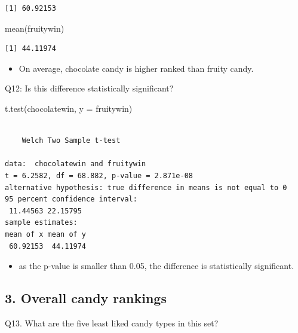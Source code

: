 \documentclass[
  letterpaper,
  DIV=11,
  numbers=noendperiod]{scrartcl}
\newenvironment{Shaded}{\begin{snugshade}}{\end{snugshade}}
\newcommand{\AttributeTok}[1]{\textcolor[rgb]{0.40,0.45,0.13}{#1}}
\newcommand{\DecValTok}[1]{\textcolor[rgb]{0.68,0.00,0.00}{#1}}
\newcommand{\FunctionTok}[1]{\textcolor[rgb]{0.28,0.35,0.67}{#1}}
\newcommand{\NormalTok}[1]{\textcolor[rgb]{0.00,0.23,0.31}{#1}}
\newcommand{\SpecialCharTok}[1]{\textcolor[rgb]{0.37,0.37,0.37}{#1}}
\providecommand{\tightlist}{%
  \setlength{\itemsep}{0pt}\setlength{\parskip}{0pt}}\usepackage{longtable,booktabs,array}
\begin{document}
\begin{verbatim}
[1] 60.92153
\end{verbatim}

\begin{Shaded}
\begin{Highlighting}[]
\FunctionTok{mean}\NormalTok{(fruitywin)}
\end{Highlighting}
\end{Shaded}

\begin{verbatim}
[1] 44.11974
\end{verbatim}

\begin{itemize}
\tightlist
\item
  On average, chocolate candy is higher ranked than fruity candy.
\end{itemize}

Q12: Is this difference statistically significant?

\begin{Shaded}
\begin{Highlighting}[]
\FunctionTok{t.test}\NormalTok{(chocolatewin, }\AttributeTok{y =}\NormalTok{ fruitywin)}
\end{Highlighting}
\end{Shaded}

\begin{verbatim}

    Welch Two Sample t-test

data:  chocolatewin and fruitywin
t = 6.2582, df = 68.882, p-value = 2.871e-08
alternative hypothesis: true difference in means is not equal to 0
95 percent confidence interval:
 11.44563 22.15795
sample estimates:
mean of x mean of y 
 60.92153  44.11974 
\end{verbatim}

\begin{itemize}
\tightlist
\item
  as the p-value is smaller than 0.05, the difference is statistically
  significant.
\end{itemize}

\hypertarget{overall-candy-rankings}{%
\subsection{3. Overall candy rankings}\label{overall-candy-rankings}}

Q13. What are the five least liked candy types in this set?

\begin{Shaded}
\end{Shaded}
\end{document}
